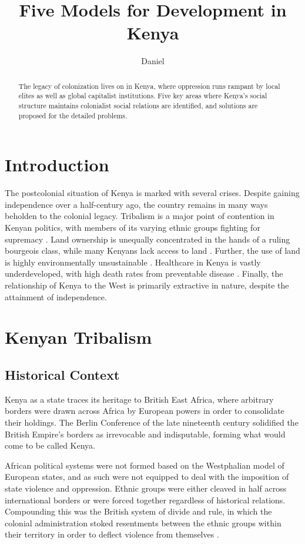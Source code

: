 \documentclass[american]{../../../coursework}
\title{Five Models for Development in Kenya}
\subtitle{}
\author{Daniel}{Glenn}{Leonard}
\date{\displaydate{date}}
\begin{document}
\maketitle
\setcounter{page}{23}
\begin{abstract}
    The legacy of colonization lives on in Kenya, where oppression runs
    rampant by local elites as well as global capitalist institutions. Five
    key areas where Kenya's social structure maintains colonialist social
    relations are identified, and solutions are proposed for the detailed
    problems.
\end{abstract}

\printkeywords

\section{Introduction}

The postcolonial situation of Kenya is marked with several crises. Despite
gaining independence over a half-century ago, the country remains in many ways
beholden to the colonial legacy. Tribalism is a major point of contention in
Kenyan politics, with members of its varying ethnic groups fighting for
supremacy \parencite{Orvis2001}. Land ownership is unequally concentrated in
the hands of a ruling bourgeois class, while many Kenyans lack access to land
\parencite{Syagga2006}. Further, the use of land is highly environmentally
unsustainable \parencite{Syagga2006}. Healthcare in Kenya is vastly
underdeveloped, with high death rates from preventable disease
\parencite{Feikin2011}. Finally, the relationship of Kenya to the West is
primarily extractive in nature, despite the attainment of independence.

\section{Kenyan Tribalism}
\subsection{Historical Context}

Kenya as a state traces its heritage to British East Africa, where arbitrary
borders were drawn across Africa by European powers in order to consolidate
their holdings. The Berlin Conference of the late nineteenth century
solidified the British Empire's borders as irrevocable and indisputable,
forming what would come to be called Kenya.

African political systems were not formed based on the Westphalian model of
European states, and as such were not equipped to deal with the imposition of
state violence and oppression. Ethnic groups were either cleaved in half
across international borders or were forced together regardless of historical
relations. Compounding this was the British system of divide and rule, in
which the colonial administration stoked resentments between the ethnic groups
within their territory in order to deflect violence from themselves
\parencite{Wesseling1996}.
\end{document}
